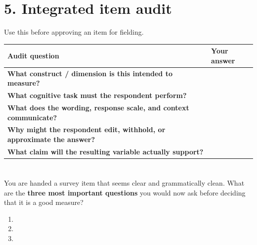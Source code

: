 \documentclass[11pt]{article}
\newcommand{\blank}[1]{\vspace{#1}}
\begin{document}
\newpage

\section*{5. Integrated item audit}

Use this before approving an item for fielding.

\begin{tabularx}{\textwidth}{>{\bfseries}p{}X}
\toprule
Audit question & Your answer \\
\midrule
What construct / dimension is this intended to measure? & \\[0.65in]
What cognitive task must the respondent perform? & \\[0.65in]
What does the wording, response scale, and context communicate? & \\[0.65in]
Why might the respondent edit, withhold, or approximate the answer? & \\[0.65in]
What claim will the resulting variable actually support? & \\[0.65in]
\bottomrule
\end{tabularx}

\section*{}

You are handed a survey item that seems clear and grammatically clean. What are the \textbf{three most important questions} you would now ask before deciding that it is a good measure?

\begin{enumerate}[leftmargin=*]
\item \blank{0.34in}
\item \blank{0.34in}
\item \blank{0.34in}
\end{enumerate}
\end{document}
